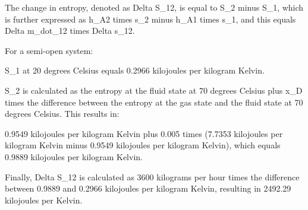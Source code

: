 The change in entropy, denoted as Delta S_12, is equal to S_2 minus S_1, which is further expressed as h_A2 times s_2 minus h_A1 times s_1, and this equals Delta m_dot_12 times Delta s_12.

For a semi-open system:

S_1 at 20 degrees Celsius equals 0.2966 kilojoules per kilogram Kelvin.

S_2 is calculated as the entropy at the fluid state at 70 degrees Celsius plus x_D times the difference between the entropy at the gas state and the fluid state at 70 degrees Celsius. This results in:

0.9549 kilojoules per kilogram Kelvin plus 0.005 times (7.7353 kilojoules per kilogram Kelvin minus 0.9549 kilojoules per kilogram Kelvin), which equals 0.9889 kilojoules per kilogram Kelvin.

Finally, Delta S_12 is calculated as 3600 kilograms per hour times the difference between 0.9889 and 0.2966 kilojoules per kilogram Kelvin, resulting in 2492.29 kilojoules per Kelvin.